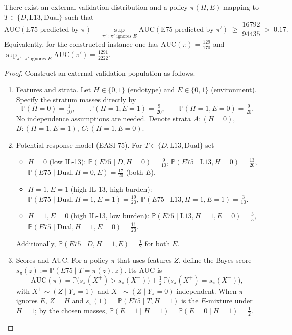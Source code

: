 ﻿\begin{theorem}\label{thm:extval-auc-gap}
There exist an external-validation distribution and a policy $\pi(H,E)$ mapping to $T\in\{D,\mathrm{L13},\mathrm{Dual}\}$ such that
\[
\mathrm{AUC}(\text{E75 predicted by }\pi) - \sup_{\pi'\,:\,\pi'\text{ ignores }E}\mathrm{AUC}(\text{E75 predicted by }\pi')\;\ge\;\frac{16792}{94435}\;>\;0.17.
\]
Equivalently, for the constructed instance one has $\mathrm{AUC}(\pi)=\tfrac{129}{170}$ and $\sup_{\pi'\,:\,\pi'\text{ ignores }E}\mathrm{AUC}(\pi')=\tfrac{1291}{2222}$.
\end{theorem}

\begin{proof}
Construct an external-validation population as follows.
\begin{enumerate}
\item Features and strata. Let $H\in\{0,1\}$ (endotype) and $E\in\{0,1\}$ (environment). Specify the stratum masses directly by
\[
\mathbb P(H=0)=\tfrac{1}{10},\qquad \mathbb P(H=1,E=1)=\tfrac{9}{20},\qquad \mathbb P(H=1,E=0)=\tfrac{9}{20}.
\]
No independence assumptions are needed. Denote strata $A:(H=0)$, $B:(H=1,E=1)$, $C:(H=1,E=0)$.

\item Potential-response model (EASI-75). For $T\in\{D,\mathrm{L13},\mathrm{Dual}\}$ set
\begin{itemize}
\item $H=0$ (low IL-13): $\mathbb P(E75\mid D,H=0)=\tfrac{9}{10}$, $\mathbb P(E75\mid \mathrm{L13},H=0)=\tfrac{13}{20}$, $\mathbb P(E75\mid \mathrm{Dual},H=0,E)=\tfrac{17}{20}$ (both $E$).
\item $H=1,E=1$ (high IL-13, high burden): $\mathbb P(E75\mid \mathrm{Dual},H=1,E=1)=\tfrac{19}{20}$, $\mathbb P(E75\mid \mathrm{L13},H=1,E=1)=\tfrac{3}{10}$.
\item $H=1,E=0$ (high IL-13, low burden): $\mathbb P(E75\mid \mathrm{L13},H=1,E=0)=\tfrac{3}{5}$, $\mathbb P(E75\mid \mathrm{Dual},H=1,E=0)=\tfrac{11}{20}$.
\end{itemize}
Additionally, $\mathbb P(E75\mid D,H=1,E)=\tfrac{1}{2}$ for both $E$.

\item Scores and AUC. For a policy $\pi$ that uses features $Z$, define the Bayes score $s_{\pi}(z):=\mathbb P(E75\mid T=\pi(z),z)$. Its AUC is
\[
\mathrm{AUC}(\pi)=\mathbb P\big(s_{\pi}(X^+) > s_{\pi}(X^-)\big)+\tfrac12\,\mathbb P\big(s_{\pi}(X^+) = s_{\pi}(X^-)\big),
\]
with $X^+\sim(Z\mid Y_{\pi}=1)$ and $X^-\sim(Z\mid Y_{\pi}=0)$ independent. When $\pi$ ignores $E$, $Z=H$ and $s_{\pi}(1)=\mathbb P(E75\mid T, H=1)$ is the $E$-mixture under $H=1$; by the chosen masses, $\mathbb P(E=1\mid H=1)=\mathbb P(E=0\mid H=1)=\tfrac12$.


\end{enumerate}
\end{proof}
